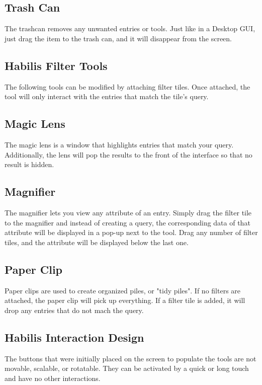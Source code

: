 \documentclass{article}
\begin{document}
\subsection*{Trash Can}
The trashcan removes any unwanted entries or tools.  Just like in a Desktop GUI, just drag the item to the trash can, and it will disappear from the screen.  
\subsection{Habilis Filter Tools}
The following tools can be modified by attaching filter tiles.  Once attached, the tool will only interact with the entries that match the tile's query.  
\subsection*{Magic Lens}
The magic lens is a window that highlights entries that match your query.  Additionally, the lens will pop the results to the front of the interface so that no result is hidden.  
\subsection*{Magnifier}
The magnifier lets you view any attribute of an entry.  Simply drag the filter tile to the magnifier and instead of creating a query, the corresponding data of that attribute will be displayed in a pop-up next to the tool.  Drag any number of filter tiles, and the attribute will be displayed below the last one.  
\subsection*{Paper Clip}
Paper clips are used to create organized piles, or "tidy piles".  If no filters are attached, the paper clip will pick up everything.  If a filter tile is added, it will drop any entries that do not mach the query.  
\subsection{Habilis Interaction Design}
The buttons that were initially placed on the screen to populate the tools are not movable, scalable, or rotatable.  They can be activated by a quick or long touch and have no other interactions.  
\end{document}
